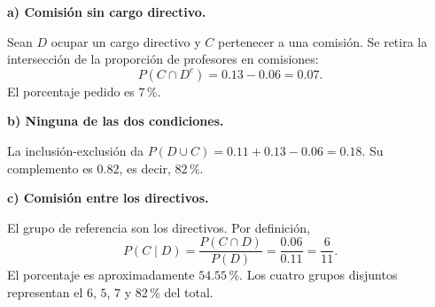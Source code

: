 \textbf{a) Comisión sin cargo directivo.}\par\nopagebreak[4]
Sean $D$ ocupar un cargo directivo y $C$ pertenecer a una comisión. Se retira la intersección de la proporción de profesores en comisiones:
\[
P(C\cap D^c)=0.13-0.06=0.07.
\]
El porcentaje pedido es $\boxed{7\,\text{\%}}$.

\textbf{b) Ninguna de las dos condiciones.}\par\nopagebreak[4]
La inclusión-exclusión da $P(D\cup C)=0.11+0.13-0.06=0.18$. Su complemento es $0.82$, es decir, $\boxed{82\,\text{\%}}$.

\textbf{c) Comisión entre los directivos.}\par\nopagebreak[4]
El grupo de referencia son los directivos. Por definición,
\[
P(C\mid D)=\frac{P(C\cap D)}{P(D)}=\frac{0.06}{0.11}=\frac6{11}.
\]
El porcentaje es aproximadamente $\boxed{54.55\,\text{\%}}$. Los cuatro grupos disjuntos representan el $6$, $5$, $7$ y 82\,\% del total.
